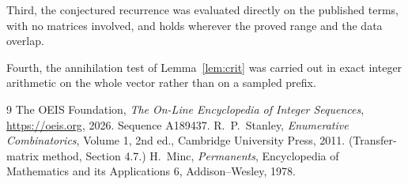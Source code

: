 \documentclass[11pt,a4paper]{article}
\theoremstyle{plain}
\theoremstyle{definition}
\begin{document}
Third, the conjectured recurrence was evaluated directly on the published terms, with no
matrices involved, and holds wherever the proved range and the data overlap.

Fourth, the annihilation test of Lemma~\ref{lem:crit} was carried out in exact integer
arithmetic on the whole vector rather than on a sampled prefix.

\begin{thebibliography}{9}
 The OEIS Foundation, \emph{The On-Line Encyclopedia of Integer
Sequences}, \url{https://oeis.org}, 2026. Sequence A189437.
 R.~P.~Stanley, \emph{Enumerative Combinatorics}, Volume 1, 2nd ed.,
Cambridge University Press, 2011. (Transfer-matrix method, Section 4.7.)
 H.~Minc, \emph{Permanents}, Encyclopedia of Mathematics and its
Applications 6, Addison--Wesley, 1978.
\end{thebibliography}
\end{document}
